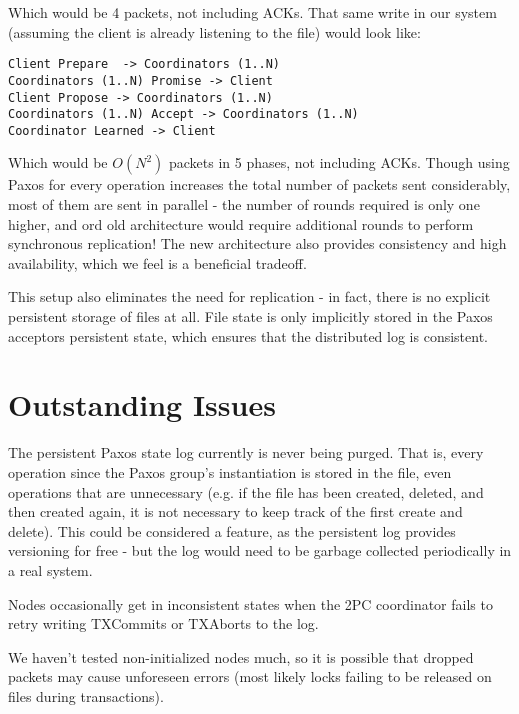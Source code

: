 \documentclass[11pt]{article}
\begin{document}
Which would be 4 packets, not including ACKs.
That same write in our system (assuming the client is already listening to the file) would look like:

\begin{verbatim}
Client Prepare  -> Coordinators (1..N)
Coordinators (1..N) Promise -> Client
Client Propose -> Coordinators (1..N)
Coordinators (1..N) Accept -> Coordinators (1..N)
Coordinator Learned -> Client
\end{verbatim}

Which would be $O(N^2)$ packets in 5 phases, not including ACKs.
Though using Paxos for every operation increases the total number of packets sent considerably, most of them are sent in parallel -
the number of rounds required is only one higher, and ord old architecture would require additional rounds to perform synchronous replication! 
The new architecture also provides consistency and high availability, which we feel is a beneficial tradeoff.

This setup also eliminates the need for replication - in fact, there is no explicit persistent storage of files at all. 
File state is only implicitly stored in the Paxos acceptors persistent state, which ensures that the distributed log is consistent.

\section{Outstanding Issues}

The persistent Paxos state log currently is never being purged.
That is, every operation since the Paxos group's instantiation is stored in the file, even operations that are unnecessary (e.g. if the file has been created, deleted, and then created again, it is not necessary to keep track of the first create and delete).
This could be considered a feature, as the persistent log provides versioning for free - but the log would need to be garbage collected periodically in a real system.

Nodes occasionally get in inconsistent states when the 2PC coordinator fails to retry writing TXCommits or TXAborts to the log.

We haven't tested non-initialized nodes much, so it is possible that dropped packets may cause unforeseen errors (most likely locks failing to be released on files during transactions).
\end{document}
